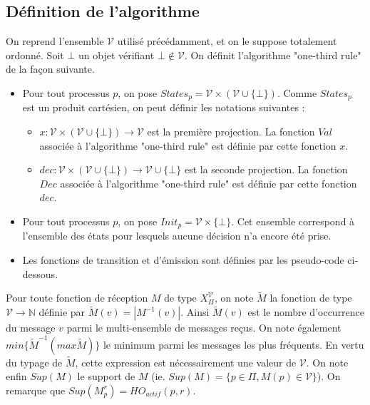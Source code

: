 \documentclass{article}
\begin{document}
\subsection{Définition de l'algorithme}

On reprend l'ensemble $\mathcal{V}$ utilisé précédamment, et on le suppose totalement ordonné. Soit $\bot$ un objet vérifiant $\bot \notin \mathcal{V}$.
On définit l'algorithme "one-third rule" de la façon suivante.
\begin{itemize}
	\item Pour tout processus $p$, on pose $States_p = \mathcal{V} \times (\mathcal{V} \cup \{ \bot \})$.
	Comme $States_p$ est un produit cartésien, on peut définir les notations suivantes :
	\begin{itemize}

		\item $x : \mathcal{V} \times (\mathcal{V} \cup \{ \bot \}) \rightarrow \mathcal{V}$ est la première projection.
			La fonction $Val$ associée à l'algorithme "one-third rule" est définie par cette fonction $x$.
		\item $dec : \mathcal{V} \times (\mathcal{V} \cup \{ \bot \}) \rightarrow \mathcal{V} \cup \{\bot\}$ est la seconde projection.
			La fonction $Dec$ associée à l'algorithme "one-third rule" est définie par cette fonction $dec$.

	\end{itemize}
\item Pour tout processus $p$, on pose $Init_p = \mathcal{V} \times \{ \bot \}$. Cet ensemble correspond à l'ensemble des états pour lesquels aucune décision n'a encore été prise.
\item Les fonctions de transition et d'émission sont définies par les pseudo-code ci-dessous.
\end{itemize}
Pour toute fonction de réception $M$ de type $X_\Pi^\mathcal{V}$, on note $\widetilde{M}$ la fonction de type $\mathcal{V} \rightarrow \mathds{N}$ définie par $\widetilde{M}(v) = |M^{-1}(v)|$.
Ainsi $\widetilde{M}(v)$ est le nombre d'occurrence du message $v$ parmi le multi-ensemble de messages reçus.
On note également $min \{\widetilde{M}^{-1} (max \widetilde{M})\}$  le minimum parmi les messages les plus fréquents. En vertu du typage de $\widetilde{M}$, cette expression est nécessairement
une valeur de $\mathcal{V}$.
On note enfin $Sup(M)$ le support de $M$ (ie. $Sup(M) = \{p \in \Pi, M(p) \in \mathcal{V}\}$). On remarque que $Sup(M_p^r) = HO_{actif}(p,r)$. 
\end{document}
